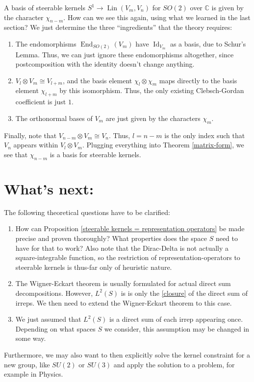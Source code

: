 \documentclass[12pt, a4paper]{article}
\theoremstyle{plain}
\theoremstyle{definition}
\theoremstyle{remark}
\newcommand{\C}{\mathds{C}}
\DeclareMathOperator{\lin}{Lin}
\DeclareMathOperator{\End}{End}
\DeclareMathOperator{\Id}{Id}
\begin{document}
A basis of steerable kernels $S^1 \to \lin(V_m, V_n)$ for $SO(2)$ over $\C$ is given by the character $\chi_{n-m}$. How can we see this again, using what we learned in the last section? We just determine the three ``ingredients'' that the theory requires:
\begin{enumerate}
\item The endomorphisms $\End_{SO(2)}(V_m)$ have $\Id_{V_m}$ as a basis, due to Schur's Lemma. Thus, we can just ignore these endomorphisms altogether, since postcomposition with the identity doesn't change anything.
\item $V_l \otimes V_m \cong V_{l+m}$, and the basis element $\chi_l \otimes \chi_m$ maps directly to the basis element $\chi_{l+m}$ by this isomorphism. Thus, the only existing Clebsch-Gordan coefficient is just $1$.
\item The orthonormal bases of $V_m$ are just given by the characters $\chi_m$.
\end{enumerate}
Finally, note that $V_{n-m} \otimes V_m \cong V_n$. Thus, $l = n-m$ is the only index such that $V_n$ appears within $V_l \otimes V_m$. Plugging everything into Theorem \ref{matrix-form}, we see that $\chi_{n-m}$ is a basis for steerable kernels.


\section{What's next:}

The following theoretical questions have to be clarified:

\begin{enumerate}
\item How can Proposition \ref{steerable kernels = representation operators} be made precise and proven thoroughly? What properties does the space $S$ need to have for that to work? Also note that the Dirac-Delta is not actually a square-integrable function, so the restriction of representation-operators to steerable kernels is thus-far only of heuristic nature. 
\item The Wigner-Eckart theorem is usually formulated for actual direct sum decompositions. However, $L^2(S)$ is is only the \ref{closure} of the direct sum of irreps. We then need to extend the Wigner-Eckart theorem to this case.
\item We just assumed that $L^2(S)$ is a direct sum of each irrep appearing once. Depending on what spaces $S$ we consider, this assumption may be changed in some way.
\end{enumerate}

Furthermore, we may also want to then explicitly solve the kernel constraint for a new group, like $SU(2)$ or $SU(3)$ and apply the solution to a problem, for example in Physics.




\end{document}
